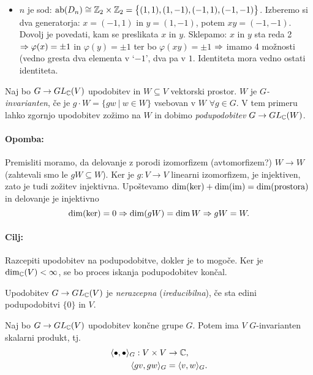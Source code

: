 \begin{zgled}
\begin{itemize}
{\begin{itemize}
{\begin{enumerate}
{							\begin{align*}
								\varphi(1) &= 1, \\
								\varphi(-1) &= -1.
							\end{align*}}
					\end{enumerate}}
				\item{$n$ je sod: $\operatorname{ab}(D_n) \cong \mathbb{Z}_2 \times \mathbb{Z}_2 = \big\{(1,1), (1,-1), (-1,1), (-1,-1)\big\}$.
				Izberemo si dva generatorja: $x = (-1,1)$ in $y = (1,-1)$, potem $xy = (-1,-1)$. Dovolj je povedati,
				kam se preslikata $x$ in $y$. Sklepamo: $x$ in $y$ sta reda 2 $\Rightarrow \varphi(x) = \pm 1$ in
				$\varphi(y) = \pm 1$ ter bo $\varphi(xy) = \pm 1$ $\Rightarrow$ imamo 4 mo\v znosti (vedno gresta dva elementa
				v `$-1$', dva pa v $1$. Identiteta mora vedno ostati identiteta.}
			\end{itemize}}
	\end{itemize}
\end{zgled}

\begin{defin}
	Naj bo $G \to GL_{\mathbb{C}}(V)$ upodobitev in $W \subseteq V$ vektorski prostor. $W$ je \emph{$G$-invarianten}, \v ce je $g\cdot W = \{gw\ |\ w\in W\}$ vsebovan
	v $W$ $\forall g \in G$. V tem primeru lahko zgornjo upodobitev zo\v zimo na $W$ in dobimo \emph{podupodobitev} $G \to GL_{\mathbb{C}}(W)$.
\end{defin}

\paragraph{Opomba:} Premisliti moramo, da delovanje z porodi izomorfizem (avtomorfizem?) $W \to W$ (zahtevali smo le $gW \subseteq W$). Ker je $g : V \to V$ linearni
izomorfizem, je injektiven, zato je tudi zo\v zitev injektivna. Upo\v stevamo $\dim(\ker) + \dim(\operatorname{im}) = \dim(\text{prostora})$ in delovanje je injektivno
\[
	\dim(\ker) = 0 \Rightarrow \dim(gW) = \dim W \Rightarrow gW = W.
\]
\paragraph{Cilj:} Razcepiti upodobitev na podupodobitve, dokler je to mogo\v ce. Ker je $\dim_{\mathbb{C}}(V) < \infty$, se bo proces iskanja podupodobitev kon\v cal.
\begin{defin}
	Upodobitev $G \to GL_{\mathbb{C}}(V)$ je {\em nerazcepna} ({\em ireducibilna}), \v ce sta edini podupodobitvi $\{0\}$ in $V$.
\end{defin}

\begin{lema}
	Naj bo $G \to GL_{\mathbb{C}}(V)$ upodobitev kon\v cne grupe $G$. Potem ima $V$ $G$-invarianten skalarni produkt, tj.
	\begin{align*}
		\langle \bullet, \bullet \rangle_G : V \times V &\to \mathbb{C}, \\
		\langle gv, gw \rangle_G &= \langle v, w \rangle_G.
	\end{align*}
\end{lema}

